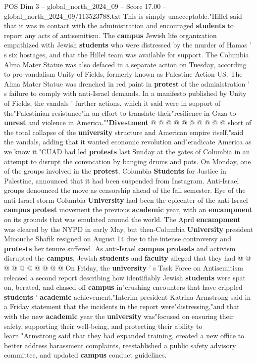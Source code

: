 \begin{textsample}{POS Dim 3 – global\_north\_2024\_09 – Score 17.00 – global\_north\_2024\_09/113523788.txt}
This is simply unacceptable."Hillel said that it was in contact with the administration and encouraged \textbf{students} to report any acts of antisemitism.
The \textbf{campus} Jewish life organization empathized with Jewish \textbf{students} who were distressed by the murder of Hamas ' s six hostages, and that the Hillel team was available for support.
The Columbia Alma Mater Statue was also defaced in a separate action on Tuesday, according to pro-vandalism Unity of Fields, formerly known as Palestine Action US.
The Alma Mater Statue was drenched in red paint in \textbf{protest} of the administration ' s failure to comply with anti-Israel demands.
In a manifesto published by Unity of Fields, the vandals ' further actions, which it said were in support of the"Palestinian resistance"in an effort to translate their"resilience in Gaza to \textbf{unrest} and violence in America.""\textbf{Divestment} @ @ @ @ @ @ @ @ @ @ short of the total collapse of the \textbf{university} structure and American empire itself,"said the vandals, adding that it wanted economic revolution and"eradicate America as we know it."CUAD had led \textbf{protests} last Sunday at the gates of Columbia in an attempt to disrupt the convocation by banging drums and pots.
On Monday, one of the groups involved in the \textbf{protest}, Columbia \textbf{Students} for Justice in Palestine, announced that it had been suspended from Instagram.
Anti-Israel groups denounced the move as censorship ahead of the fall semester.
Eye of the anti-Israel storm Columbia \textbf{University} had been the epicenter of the anti-Israel \textbf{campus} \textbf{protest} movement the previous \textbf{academic} year, with an \textbf{encampment} on its grounds that was emulated around the world.
The April \textbf{encampment} was cleared by the NYPD in early May, but then-Columbia \textbf{University} president Minouche Shafik resigned on August 14 due to the intense controversy and \textbf{protests} her tenure suffered.
As anti-Israel \textbf{campus} \textbf{protests} and activism disrupted the \textbf{campus}, Jewish \textbf{students} and \textbf{faculty} alleged that they had @ @ @ @ @ @ @ @ @ @ On Friday, the \textbf{university} ' s Task Force on Antisemitism released a second report describing how identifiably Jewish \textbf{students} were spat on, berated, and chased off \textbf{campus} in"crushing encounters that have crippled \textbf{students} ' \textbf{academic} achievement."Interim president Katrina Armstrong said in a Friday statement that the incidents in the report were"distressing,"and that with the new \textbf{academic} year the \textbf{university} was"focused on ensuring their safety, supporting their well-being, and protecting their ability to learn."Armstrong said that they had expanded training, created a new office to better address harassment complaints, reestablished a public safety advisory committee, and updated \textbf{campus} conduct guidelines.

\end{textsample}
